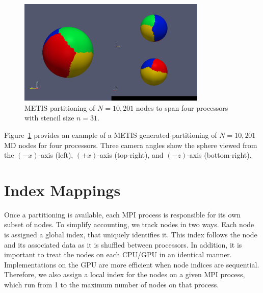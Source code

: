 \documentclass{report}
\begin{document}
\begin{figure}
\begin{center}
\includegraphics[width=0.8\textwidth]{rbffd_methods_content/decompositions/gpmetis_decomp_sphere_4parts.png}
\caption{METIS partitioning of $N=10,201$ nodes to span four processors with stencil size $n=31$. }
\label{fig:metis_decomposed_sphere}
\end{center}
\end{figure}

Figure~\ref{fig:metis_decomposed_sphere} provides an example of a METIS generated partitioning of $N=10,201$ MD nodes for four processors. Three camera angles show the sphere viewed from the $(-x)$-axis (left), $(+x)$-axis (top-right), and $(-z)$-axis (bottom-right). 









\section{Index Mappings}

Once a partitioning is available, each MPI process is responsible for its own subset of nodes. 
To simplify accounting, we track nodes in two ways. Each node is assigned
a global index, that uniquely identifies it. This index follows the node 
and its associated data as it is shuffled between processors. In addition, 
it is important to treat the nodes on each CPU/GPU in an identical manner. 
Implementations on the GPU are more efficient when node indices
are sequential. Therefore, we also assign a local index for the nodes on 
a given MPI process, which run from 1 to the maximum number of nodes on that process. 
\end{document}
